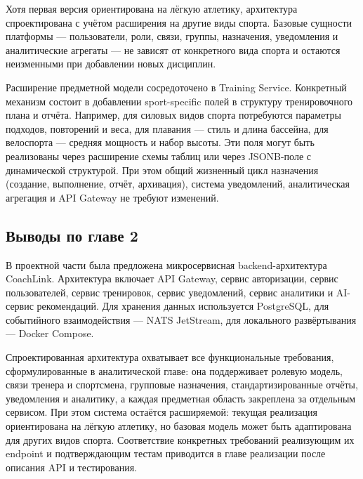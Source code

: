 Хотя первая версия ориентирована на лёгкую атлетику, архитектура спроектирована с учётом расширения на другие виды спорта. Базовые сущности платформы --- пользователи, роли, связи, группы, назначения, уведомления и аналитические агрегаты --- не зависят от конкретного вида спорта и остаются неизменными при добавлении новых дисциплин.

Расширение предметной модели сосредоточено в Training Service. Конкретный механизм состоит в добавлении sport-specific полей в структуру тренировочного плана и отчёта. Например, для силовых видов спорта потребуются параметры подходов, повторений и веса, для плавания --- стиль и длина бассейна, для велоспорта --- средняя мощность и набор высоты. Эти поля могут быть реализованы через расширение схемы таблиц или через JSONB-поле с динамической структурой. При этом общий жизненный цикл назначения (создание, выполнение, отчёт, архивация), система уведомлений, аналитическая агрегация и API Gateway не требуют изменений.

\subsection{Выводы по главе 2}

В проектной части была предложена микросервисная backend-архитектура CoachLink. Архитектура включает API Gateway, сервис авторизации, сервис пользователей, сервис тренировок, сервис уведомлений, сервис аналитики и AI-сервис рекомендаций. Для хранения данных используется PostgreSQL, для событийного взаимодействия --- NATS JetStream, для локального развёртывания --- Docker Compose.

Спроектированная архитектура охватывает все функциональные требования, сформулированные в аналитической главе: она поддерживает ролевую модель, связи тренера и спортсмена, групповые назначения, стандартизированные отчёты, уведомления и аналитику, а каждая предметная область закреплена за отдельным сервисом. При этом система остаётся расширяемой: текущая реализация ориентирована на лёгкую атлетику, но базовая модель может быть адаптирована для других видов спорта. Соответствие конкретных требований реализующим их endpoint и подтверждающим тестам приводится в главе реализации после описания API и тестирования.
